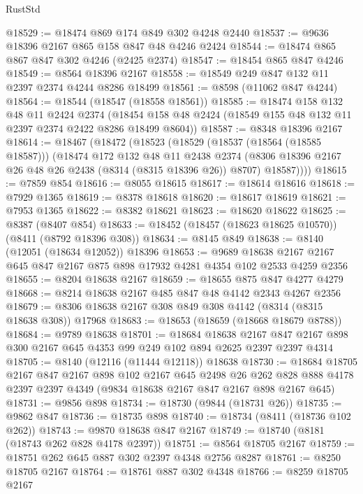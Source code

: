 \begin{lexlean}{RustStd}
\begin{coremodule}
@18529 := @18474 @869 @174 @849 @302 @4248 @2440
@18537 := @9636 @18396 @2167 @865 @158 @847 @48 @4246 @2424
@18544 := @18474 @865 @867 @847 @302 @4246 (@2425 @2374)
@18547 := @18454 @865 @847 @4246
@18549 := @8564 @18396 @2167
@18558 := @18549 @249 @847 @132 @11 @2397 @2374 @4244 @8286 @18499
@18561 := @8598 (@11062 @847 @4244)
@18564 := @18544 (@18547 (@18558 @18561))
@18585 := @18474
    @158
    @132
    @48
    @11
    @2424
    @2374
    (@18454 @158 @48 @2424 (@18549 @155 @48 @132 @11 @2397 @2374 @2422 @8286 @18499 @8604))
@18587 := @8348 @18396 @2167
@18614 := @18467
    (@18472
      (@18523
        (@18529
          (@18537 (@18564 (@18585 @18587)))
          (@18474
            @172
            @132
            @48
            @11
            @2438
            @2374
            (@8306 @18396 @2167 @26 @48 @26 @2438 (@8314 (@8315 @18396 @26)) @8707)
            @18587))))
@18615 := @7859 @854
@18616 := @8055 @18615
@18617 := @18614 @18616
@18618 := @7929 @1365
@18619 := @8378 @18618
@18620 := @18617 @18619
@18621 := @7953 @1365
@18622 := @8382 @18621
@18623 := @18620 @18622
@18625 := @8387 (@8407 @854)
@18633 := @18452 (@18457 (@18623 @18625 @10570)) (@8411 (@8792 @18396 @308))
@18634 := @8145 @849
@18638 := @8140 (@12051 (@18634 @12052)) @18396
@18653 := @9689
    @18638
    @2167
    @2167
    @645
    @847
    @2167
    @875
    @898
    @17932
    @4281
    @4354
    @102
    @2533
    @4259
    @2356
@18655 := @8204 @18638 @2167
@18659 := @18655 @875 @847 @4277 @4279
@18668 := @8214 @18638 @2167 @485 @847 @48 @4142 @2343 @4267 @2356
@18679 := @8306 @18638 @2167 @308 @849 @308 @4142 (@8314 (@8315 @18638 @308)) @17968
@18683 := @18653 (@18659 (@18668 @18679 @8788))
@18684 := @9789 @18638
@18701 := @18684
    @18638
    @2167
    @847
    @2167
    @898
    @300
    @2167
    @645
    @4353
    @99
    @249
    @102
    @894
    @2625
    @2397
    @2397
    @4314
@18705 := @8140 (@12116 (@11444 @12118)) @18638
@18730 := @18684
    @18705
    @2167
    @847
    @2167
    @898
    @102
    @2167
    @645
    @2498
    @26
    @262
    @828
    @888
    @4178
    @2397
    @2397
    @4349
    (@9834 @18638 @2167 @847 @2167 @898 @2167 @645)
@18731 := @9856 @898
@18734 := @18730 (@9844 (@18731 @26))
@18735 := @9862 @847
@18736 := @18735 @898
@18740 := @18734 (@8411 (@18736 @102 @262))
@18743 := @9870 @18638 @847 @2167
@18749 := @18740 (@8181 (@18743 @262 @828 @4178 @2397))
@18751 := @8564 @18705 @2167
@18759 := @18751 @262 @645 @887 @302 @2397 @4348 @2756 @8287
@18761 := @8250 @18705 @2167
@18764 := @18761 @887 @302 @4348
@18766 := @8259 @18705 @2167

\end{coremodule}
\end{lexlean}
